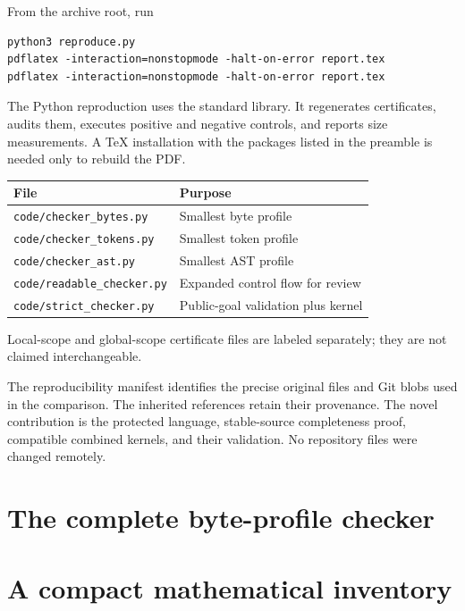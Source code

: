 \documentclass[11pt,letterpaper]{article}
\theoremstyle{definition}\newtheorem{definition}[theorem]{Definition}
\theoremstyle{remark}\newtheorem{remark}[theorem]{Remark}
\newcommand{\file}[1]{{\urlstyle{tt}\nolinkurl{#1}}}
\begin{document}
From the archive root, run
\begin{lstlisting}
python3 reproduce.py
pdflatex -interaction=nonstopmode -halt-on-error report.tex
pdflatex -interaction=nonstopmode -halt-on-error report.tex
\end{lstlisting}
The Python reproduction uses the standard library. It regenerates
certificates, audits them, executes positive and negative controls,
and reports size measurements. A TeX installation with the packages
listed in the preamble is needed only to rebuild the PDF.

\begin{center}\small
\begin{tabular}{ll}
\toprule
File & Purpose\\
\midrule
\file{code/checker_bytes.py} & Smallest byte profile\\
\file{code/checker_tokens.py} & Smallest token profile\\
\file{code/checker_ast.py} & Smallest AST profile\\
\file{code/readable_checker.py} & Expanded control flow for review\\
\file{code/strict_checker.py} & Public-goal validation plus kernel\\
\bottomrule
\end{tabular}
\end{center}
Local-scope and global-scope certificate files are labeled separately;
they are not claimed interchangeable.

The reproducibility manifest identifies the precise original files
and Git blobs used in the comparison. The inherited references retain
their provenance. The novel contribution is the protected language,
stable-source completeness proof, compatible combined kernels, and
their validation. No repository files were changed remotely.

\appendix
\section{The complete byte-profile checker}\label{app:code}



\section{A compact mathematical inventory}
\end{document}
